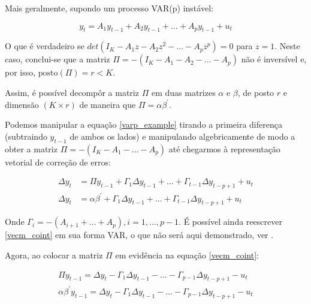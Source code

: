 \documentclass[a4paper,
               article,
               12pt,
               openany,
               oneside,
               english,
               brazil]{abntex2}
\numberwithin{equation}{section}
\begin{document}
    Mais geralmente, supondo um processo VAR(p) instável:
    
    \begin{equation}
        \label{varp_example}
        y_t = A_1 y_{t-1} + A_2 y_{t-1} + \dots + A_p y_{t-1} + u_t 
    \end{equation}

    O que é verdadeiro se $ det(I_K - A_1z - A_2z^2 - \dots - A_pz^p) = 0 $ para $ z = 1 $. Neste caso, conclui-se que a matriz $ \Pi = -(I_K - A_1 - A_2 - \dots - A_p) $ não é inversível e, por isso, $ \text{posto}(\Pi) = r < K $.
    
    Assim, é possível decompôr a matriz $ \Pi $ em duas matrizes $ \alpha $ e $ \beta $, de posto $ r $ e dimensão $ (K \times r) $ de maneira que $ \Pi = \alpha \beta^{'} $.

   Podemos manipular a equação \eqref{varp_example} tirando a primeira diferença (subtraindo $ y_{t-1} $ de ambos os lados) e manipulando algebricamente de modo a obter a matriz $ \Pi = -(I_K - A_1 - \dots - A_p) $ até chegarmos à representação vetorial de correção de erros:

   \begin{equation}
       \label{vecm_coint}
       \begin{aligned}
           \Delta y_t &= \Pi y_{t-1} + \Gamma_1 \Delta y_{t-1} + \dots + \Gamma_{t-1} \Delta y_{t-p+1} + u_t \\
           \Delta y_t &= \alpha \beta^{'} + \Gamma_1 \Delta y_{t-1} + \dots + \Gamma_{t-1} \Delta y_{t-p+1} + u_t
       \end{aligned}
   \end{equation}

   Onde $ \Gamma_i = -(A_{i+1} + \dots + A_p), i = 1, \dots, p-1 $. É possível ainda reescrever \eqref{vecm_coint} em sua forma VAR, o que não será aqui demonstrado, ver \cite[p.~248-249]{lutkepool}.

   Agora, ao colocar a matriz $ \Pi $ em evidência na equação \eqref{vecm_coint}:

   \begin{equation}
       \label{vecm_coint2}
       \begin{aligned}
       \Pi y_{t-1} = \Delta y_t - \Gamma_1 \Delta y_{t-1} - \dots - \Gamma_{p-1} \Delta y_{t-p+1} - u_t \\
           \alpha \beta^{'} y_{t-1} = \Delta y_t - \Gamma_1 \Delta y_{t-1} - \dots - \Gamma_{p-1} \Delta y_{t-p+1} - u_t
       \end{aligned}
   \end{equation}
\end{document}
